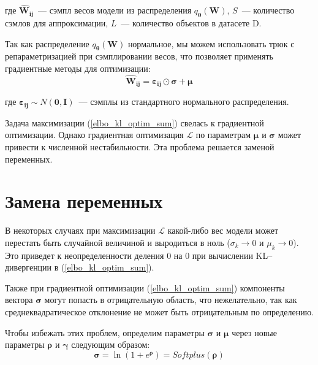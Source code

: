 \documentclass{article}
\numberwithin{equation}{section}
\begin{document}
    где $\pmb{\hat{W}_{ij}}$~--- сэмпл весов модели из распределения
    $q_{\pmb{\theta}}(\pmb{W})$,
    $S$~--- количество сэмлов для аппроксимации,
    $L$~--- количество объектов в датасете D.

    Так как распределение $q_{\pmb{\theta}}(\pmb{W})$ нормальное,
    мы можем использовать трюк с репараметризацией при сэмплировании весов,
    что позволяет применять градиентные методы для оптимизации:
    \begin{equation}\label{w_trick}
        \pmb{\hat{W}_{ij}}
        =
            \pmb{\varepsilon_{ij}}
            \odot
            \pmb{\sigma}
            +
            \pmb{\mu}
    \end{equation}

    где $\pmb{\varepsilon_{ij}} \sim N(\pmb{0}, \pmb{I})$~--- сэмплы из стандартного
    нормального распределения.

    Задача максимизации (\ref{elbo_kl_optim_sum})
    свелась к градиентной оптимизации.
    Однако градиентная оптимизация $\mathcal{L}$ по параметрам $\pmb{\mu}$ и $\pmb{\sigma}$ может привести
    к численной нестабильности. Эта проблема решается заменой переменных.

    \section{Замена переменных}

    В некоторых случаях при максимизации $\mathcal{L}$
    какой-либо вес модели может перестать быть случайной величиной
    и выродиться в ноль
    ($\sigma_{k} \rightarrow 0$ и $\mu_{k} \rightarrow 0$).
    Это приведет к неопределенности деления 0 на 0
    при вычислении KL--дивергенции в (\ref{elbo_kl_optim_sum}).

    Также при градиентной оптимизации (\ref{elbo_kl_optim_sum})
    компоненты вектора $\pmb{\sigma}$ могут попасть в отрицательную область,
    что нежелательно, так как среднеквадратическое отклонение
    не может быть отрицательным по определению.

    Чтобы избежать этих проблем,
    определим параметры $\pmb{\sigma}$ и $\pmb{\mu}$
    через новые параметры $\pmb{\rho}$ и $\pmb{\gamma}$
    следующим образом:
    \begin{equation}\label{sigma_def}
        \pmb{\sigma}
        =
            \ln({
                1 + e^{\pmb{\rho}}
            })
        =
            Softplus (\pmb{\rho})
    \end{equation}
\end{document}
